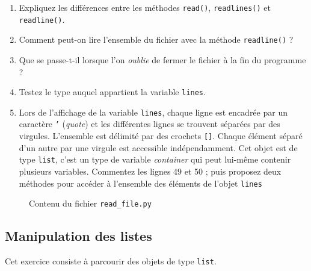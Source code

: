 \begin{enumerate}

\item Expliquez  les différences  entre les  méthodes \texttt{read()},
  \texttt{readlines()} et \texttt{readline()}.

\item  Comment peut-on lire  l'ensemble  du fichier  avec la  méthode
  \texttt{readline()} ?

\item  Que se  passe-t-il lorsque  l'on \textit{oublie}  de fermer  le
  fichier à la fin du programme ?

\item Testez le type auquel appartient la variable \texttt{lines}.

\item Lors de l'affichage de  la variable \texttt{lines}, chaque ligne
  est encadrée par un caractère \texttt{'} (\emph{quote}) et les différentes
  lignes se trouvent
  séparées par des  virgules. L'ensemble est délimité  par des crochets
  \texttt{[]}.  Chaque  élément séparé d'un autre par une  virgule est accessible
  indépendamment.  Cet objet est de  type \texttt{list}, c'est un type
  de  variable \emph{container}  qui  peut  lui-même  contenir   plusieurs  variables.
  Commentez  les lignes  49 et  50 ; puis proposez  deux méthodes  pour
  accéder à l'ensemble des éléments de l'objet \texttt{lines}

\end{enumerate}


\begin{figure}  
  
  \caption{Contenu du fichier \texttt{read\_file.py}}
  \label{stat_read_file}
\end{figure}



\subsection{Manipulation des listes}
Cet exercice consiste à parcourir des objets de type \texttt{list}.

